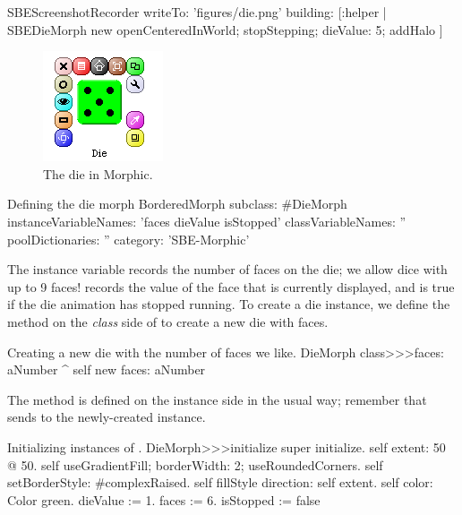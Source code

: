 \documentclass[a4paper,10pt,twoside]{book}
\begin{document}
\begin{ExecuteSmalltalkScript}
SBEScreenshotRecorder writeTo: 'figures/die.png' building: [:helper |
	SBEDieMorph new
		openCenteredInWorld;
		stopStepping;
		dieValue: 5;
		addHalo
]
\end{ExecuteSmalltalkScript}
\begin{figure}[ht]
	\centerline{\includegraphics[scale=0.65]{die}}
	\caption{The die in Morphic.
		\label{fig:dialogDie}}
\end{figure}


\begin{classdef}{Defining the die morph}
BorderedMorph subclass: #DieMorph
	instanceVariableNames: 'faces dieValue isStopped'
	classVariableNames: ''
	poolDictionaries: ''
	category: 'SBE-Morphic'
\end{classdef}

The instance variable  records the number of faces on the die; we allow dice with up to 9 faces!  records the value of the face that is currently displayed, and  is true if the die animation has stopped running.
To create a die instance, we define the  method on the \emph{class} side of  to create a new die with  faces.
\begin{method}{Creating a new die with the number of faces we like.}
DieMorph class>>>faces: aNumber
	^ self new faces: aNumber
\end{method}

The  method is defined on the instance side in the usual way; remember that  sends  to the newly-created instance.
\begin{method}{Initializing instances of .}
DieMorph>>>initialize
	super initialize.
	self extent: 50 @ 50.
	self useGradientFill; borderWidth: 2; useRoundedCorners.
	self setBorderStyle: #complexRaised.
	self fillStyle direction: self extent.
	self color: Color green.
	dieValue := 1.
	faces := 6.
	isStopped := false
\end{method}
\end{document}
